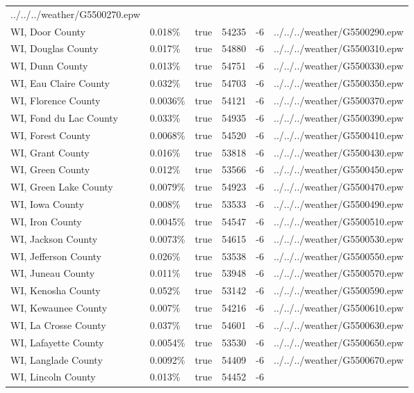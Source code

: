 \begin{longtable}[]{@{}llllll@{}}
../../../weather/G5500270.epw \\
WI, Door County & 0.018\% & true & 54235 & -6 &
../../../weather/G5500290.epw \\
WI, Douglas County & 0.017\% & true & 54880 & -6 &
../../../weather/G5500310.epw \\
WI, Dunn County & 0.013\% & true & 54751 & -6 &
../../../weather/G5500330.epw \\
WI, Eau Claire County & 0.032\% & true & 54703 & -6 &
../../../weather/G5500350.epw \\
WI, Florence County & 0.0036\% & true & 54121 & -6 &
../../../weather/G5500370.epw \\
WI, Fond du Lac County & 0.033\% & true & 54935 & -6 &
../../../weather/G5500390.epw \\
WI, Forest County & 0.0068\% & true & 54520 & -6 &
../../../weather/G5500410.epw \\
WI, Grant County & 0.016\% & true & 53818 & -6 &
../../../weather/G5500430.epw \\
WI, Green County & 0.012\% & true & 53566 & -6 &
../../../weather/G5500450.epw \\
WI, Green Lake County & 0.0079\% & true & 54923 & -6 &
../../../weather/G5500470.epw \\
WI, Iowa County & 0.008\% & true & 53533 & -6 &
../../../weather/G5500490.epw \\
WI, Iron County & 0.0045\% & true & 54547 & -6 &
../../../weather/G5500510.epw \\
WI, Jackson County & 0.0073\% & true & 54615 & -6 &
../../../weather/G5500530.epw \\
WI, Jefferson County & 0.026\% & true & 53538 & -6 &
../../../weather/G5500550.epw \\
WI, Juneau County & 0.011\% & true & 53948 & -6 &
../../../weather/G5500570.epw \\
WI, Kenosha County & 0.052\% & true & 53142 & -6 &
../../../weather/G5500590.epw \\
WI, Kewaunee County & 0.007\% & true & 54216 & -6 &
../../../weather/G5500610.epw \\
WI, La Crosse County & 0.037\% & true & 54601 & -6 &
../../../weather/G5500630.epw \\
WI, Lafayette County & 0.0054\% & true & 53530 & -6 &
../../../weather/G5500650.epw \\
WI, Langlade County & 0.0092\% & true & 54409 & -6 &
../../../weather/G5500670.epw \\
WI, Lincoln County & 0.013\% & true & 54452 & -6 &

\end{longtable}
